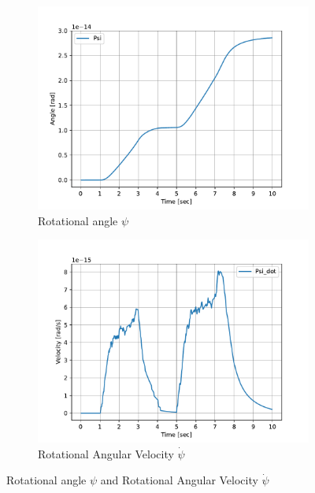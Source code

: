 \begin{figure}[h]
	\centering
	\begin{subfigure}[t]{0.45\textwidth}
		\includegraphics[width=\textwidth]{Psi}
		\caption{Rotational angle $\psi$}
		\label{fig:Psi}
	\end{subfigure}
	\begin{subfigure}[t]{0.45\textwidth}
		\includegraphics[width=\textwidth]{Psi_dot}
		\caption{Rotational Angular Velocity $\dot{\psi}$}
		\label{fig:Psi dot}
	\end{subfigure}
	\caption{Rotational angle $\psi$ and Rotational Angular Velocity $\dot{\psi}$}
	\label{fig:Psi and Psi dot}
\end{figure}

